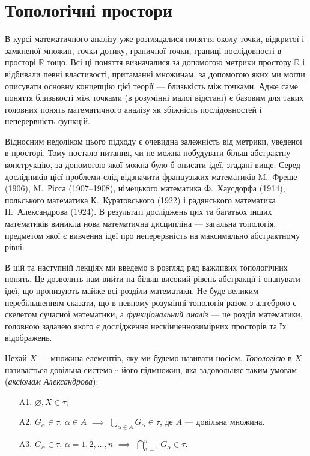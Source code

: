 \documentclass[a4paper, 12pt]{article}
\newcommand{\RR}{\mathbb{R}}
\renewcommand{\emptyset}{\varnothing}
\begin{document}
\section{Топологічні простори}

В курсі математичного аналізу уже розглядалися
поняття околу точки, відкритої і замкненої множин, точки
дотику, граничної точки, границі послідовності в просторі
$\RR$ тощо. Всі ці поняття визначалися за допомогою метрики
простору $\RR$ і відбивали певні властивості, притаманні
множинам, за допомогою яких ми могли описувати основну
концепцію цієї теорії --- близькість між точками. Адже саме
поняття близькості між точками (в розумінні малої відстані)
є базовим для таких головних понять математичного аналізу
як збіжність послідовностей і неперервність функцій. \medskip

Відносним недоліком цього підходу є очевидна
залежність від метрики, уведеної в просторі. Тому постало
питання, чи не можна побудувати більш абстрактну
конструкцію, за допомогою якої можна було б описати ідеї,
згадані вище. Серед дослідників цієї проблеми слід
відзначити французьких математиків M.~Фреше (1906),
M.~Рісса (1907--1908), німецького математика Ф.~Хаусдорфа
(1914), польського математика К.~Куратовського (1922) і
радянського математика П.~Александрова (1924). В
результаті досліджень цих та багатьох інших математиків
виникла нова математична дисципліна --- загальна
топологія, предметом якої є вивчення ідеї про неперервність
на максимально абстрактному рівні. \medskip

В цій та наступній лекціях ми введемо в розгляд ряд
важливих топологічних понять. Це дозволить нам вийти на
більш високий рівень абстракції і опанувати ідеї, що
пронизують майже всі розділи математики. Не буде
великим перебільшенням сказати, що в певному розумінні
топологія разом з алгеброю є скелетом сучасної
математики, а \textit{функціональний аналіз} --- це розділ
математики, головною задачею якого є дослідження
нескінченновимірних просторів та їх відображень.

\begin{definition}
	Нехай $X$ --- множина елементів, яку ми будемо
	називати носієм. \textit{Топологією} в $X$ називається довільна
	система $\tau$ його підмножин, яка задовольняє таким умовам
	(\textit{аксіомам Александрова}):
	\begin{enumerate}
		\item[A1.] $\emptyset, X \in \tau$;
		\item[A2.] $G_\alpha \in \tau$, $\alpha \in A$ $\implies$ $\bigcup_{\alpha \in A} G_\alpha \in \tau$, де $A$ --- довільна множина.
		\item[A3.] $G_\alpha \in \tau$, $\alpha = 1, 2, \ldots, n$ $\implies$ $\bigcap_{\alpha = 1}^n G_\alpha \in \tau$.
	\end{enumerate}
\end{definition}
\end{document}
